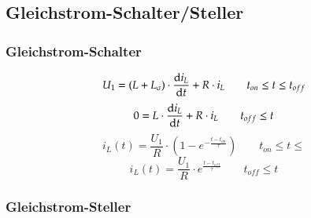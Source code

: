 \subsection{Gleichstrom-Schalter/Steller}
\subsubsection{Gleichstrom-Schalter}
\[ U_1=(L + L_{\sigma})\cdot \frac{\mathop{}\!\mathrm{d} i_L}{\mathop{}\!\mathrm{d} t}+R\cdot i_L \qquad t_{on} \leq t \leq t_{off}\]
\[ 0=L\cdot \frac{\mathop{}\!\mathrm{d} i_L}{\mathop{}\!\mathrm{d} t}+ R\cdot i_L \qquad t_{off}\leq t \]
\[ i_L(t)=\frac{U_1}{R}\cdot(1-e^{-\frac{t-t_{on}}{\tau}}) \qquad t_{on} \leq t \leq\]
\[ i_L(t)=\frac{U_1}{R}\cdot e^{\frac{t-t_{off}}{\tau}} \qquad t_{off}\leq t \]
\subsubsection{Gleichstrom-Steller}
\clearpage